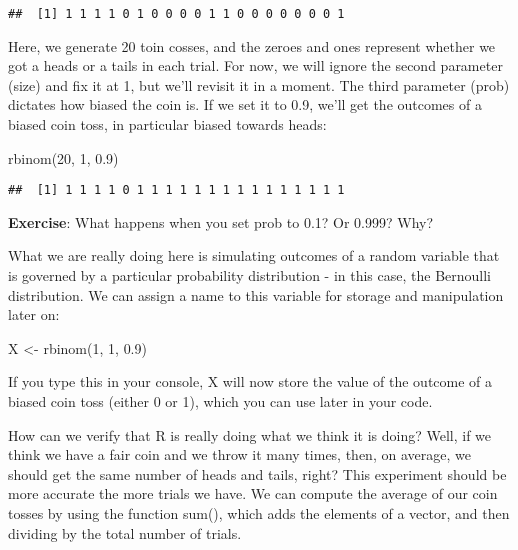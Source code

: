 \documentclass[
]{book}
\newenvironment{Shaded}{\begin{snugshade}}{\end{snugshade}}
\newcommand{\DecValTok}[1]{\textcolor[rgb]{0.00,0.00,0.81}{#1}}
\newcommand{\FloatTok}[1]{\textcolor[rgb]{0.00,0.00,0.81}{#1}}
\newcommand{\FunctionTok}[1]{\textcolor[rgb]{0.00,0.00,0.00}{#1}}
\newcommand{\NormalTok}[1]{#1}
\newcommand{\OtherTok}[1]{\textcolor[rgb]{0.56,0.35,0.01}{#1}}
\begin{document}
\begin{verbatim}
##  [1] 1 1 1 1 0 1 0 0 0 0 1 1 0 0 0 0 0 0 0 1
\end{verbatim}

Here, we generate 20 toin cosses, and the zeroes and ones represent whether we got a heads or a tails in each trial. For now, we will ignore the second parameter (size) and fix it at 1, but we'll revisit it in a moment. The third parameter (prob) dictates how biased the coin is. If we set it to 0.9, we'll get the outcomes of a biased coin toss, in particular biased towards heads:

\begin{Shaded}
\begin{Highlighting}[]
\FunctionTok{rbinom}\NormalTok{(}\DecValTok{20}\NormalTok{, }\DecValTok{1}\NormalTok{, }\FloatTok{0.9}\NormalTok{)}
\end{Highlighting}
\end{Shaded}

\begin{verbatim}
##  [1] 1 1 1 1 0 1 1 1 1 1 1 1 1 1 1 1 1 1 1 1
\end{verbatim}

\textbf{Exercise}: What happens when you set prob to 0.1? Or 0.999? Why?

What we are really doing here is simulating outcomes of a random variable that is governed by a particular probability distribution - in this case, the Bernoulli distribution. We can assign a name to this variable for storage and manipulation later on:

\begin{Shaded}
\begin{Highlighting}[]
\NormalTok{X }\OtherTok{\textless{}{-}} \FunctionTok{rbinom}\NormalTok{(}\DecValTok{1}\NormalTok{, }\DecValTok{1}\NormalTok{, }\FloatTok{0.9}\NormalTok{)}
\end{Highlighting}
\end{Shaded}

If you type this in your console, X will now store the value of the outcome of a biased coin toss (either 0 or 1), which you can use later in your code.

How can we verify that R is really doing what we think it is doing? Well, if we think we have a fair coin and we throw it many times, then, on average, we should get the same number of heads and tails, right? This experiment should be more accurate the more trials we have. We can compute the average of our coin tosses by using the function sum(), which adds the elements of a vector, and then dividing by the total number of trials.
\end{document}
